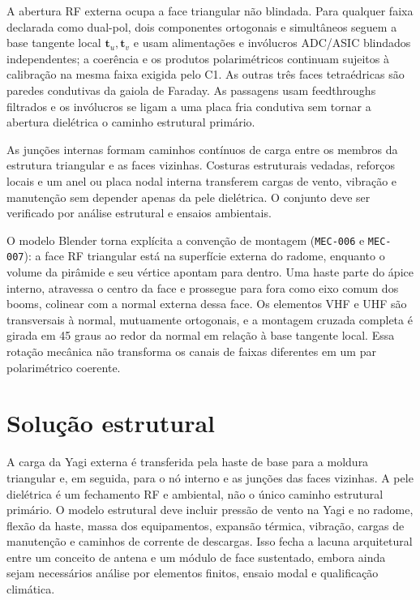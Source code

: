 A abertura RF externa ocupa a face triangular não blindada. Para qualquer faixa declarada como dual-pol, dois componentes ortogonais e simultâneos seguem a base tangente local $\mathbf{t}_u,\mathbf{t}_v$ e usam alimentações e invólucros ADC/ASIC blindados independentes; a coerência e os produtos polarimétricos continuam sujeitos à calibração na mesma faixa exigida pelo C1. As outras três faces tetraédricas são paredes condutivas da gaiola de Faraday. As passagens usam feedthroughs filtrados e os invólucros se ligam a uma placa fria condutiva sem tornar a abertura dielétrica o caminho estrutural primário.


As junções internas formam caminhos contínuos de carga entre os membros da estrutura triangular e as faces vizinhas. Costuras estruturais vedadas, reforços locais e um anel ou placa nodal interna transferem cargas de vento, vibração e manutenção sem depender apenas da pele dielétrica. O conjunto deve ser verificado por análise estrutural e ensaios ambientais.


O modelo Blender torna explícita a convenção de montagem (\texttt{MEC-006} e \texttt{MEC-007}): a face RF triangular está na superfície externa do radome, enquanto o volume da pirâmide e seu vértice apontam para dentro. Uma haste parte do ápice interno, atravessa o centro da face e prossegue para fora como eixo comum dos booms, colinear com a normal externa dessa face. Os elementos VHF e UHF são transversais à normal, mutuamente ortogonais, e a montagem cruzada completa é girada em 45 graus ao redor da normal em relação à base tangente local. Essa rotação mecânica não transforma os canais de faixas diferentes em um par polarimétrico coerente.




\section{Solução estrutural}
A carga da Yagi externa é transferida pela haste de base para a moldura triangular e, em seguida, para o nó interno e as junções das faces vizinhas. A pele dielétrica é um fechamento RF e ambiental, não o único caminho estrutural primário. O modelo estrutural deve incluir pressão de vento na Yagi e no radome, flexão da haste, massa dos equipamentos, expansão térmica, vibração, cargas de manutenção e caminhos de corrente de descargas. Isso fecha a lacuna arquitetural entre um conceito de antena e um módulo de face sustentado, embora ainda sejam necessários análise por elementos finitos, ensaio modal e qualificação climática.

